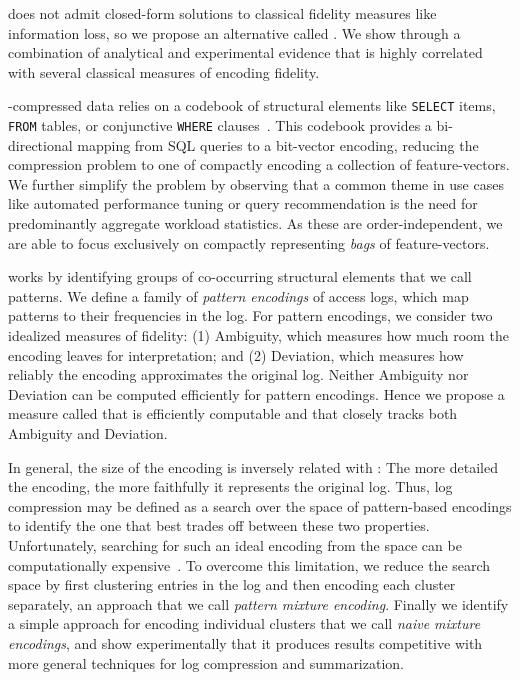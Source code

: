 \systemname does not admit closed-form solutions to classical fidelity measures like information loss, so we propose an alternative called \emph{\errorname}.
We show through a combination of analytical and experimental evidence that \errorname is highly correlated with several classical measures of encoding fidelity.

\systemname-compressed data relies on a codebook of structural elements like \texttt{SELECT} items, \texttt{FROM} tables, or conjunctive \texttt{WHERE} clauses~\cite{DBLP:journals/kais/AligonGMRT14}.
This codebook provides a bi-directional mapping from SQL queries to a bit-vector encoding, reducing the compression problem to one of compactly encoding a collection of feature-vectors.
We further simplify the problem by observing that a common theme in use cases like automated performance tuning or query recommendation is the need for predominantly aggregate workload statistics.
As these are order-independent, we are able to focus exclusively on compactly representing \emph{bags} of feature-vectors.

\systemname works by identifying groups of co-occurring structural elements that we call patterns.  
We define a family of \emph{pattern encodings} of access logs, which map patterns to their frequencies in the log.
For pattern encodings, we consider two idealized measures of fidelity: 
(1) Ambiguity, which measures how much room the encoding leaves for interpretation; and 
(2) Deviation, which measures how reliably the encoding approximates the original log.
Neither Ambiguity nor Deviation can be computed efficiently for pattern encodings.
Hence we propose a measure called \emph{\errorname} that is efficiently computable and that closely tracks both Ambiguity and Deviation.

In general, the size of the encoding is inversely related with \errorname: The more detailed the encoding, the more faithfully it represents the original log.
Thus, log compression may be defined as a search over the space of pattern-based encodings to identify the one that best trades off between these two properties.
Unfortunately, searching for such an ideal encoding from the space can be computationally expensive~\cite{DBLP:journals/tkdd/MampaeyVT12,DBLP:journals/pvldb/GebalyAGKS14}.
To overcome this limitation, we reduce the search space by first clustering entries in the log and then encoding each cluster separately, an approach that we call \textit{pattern mixture encoding}.
Finally we identify a simple approach for encoding individual clusters that we call \textit{naive mixture encodings}, and show experimentally that it produces results competitive with more general techniques for log compression and summarization.

